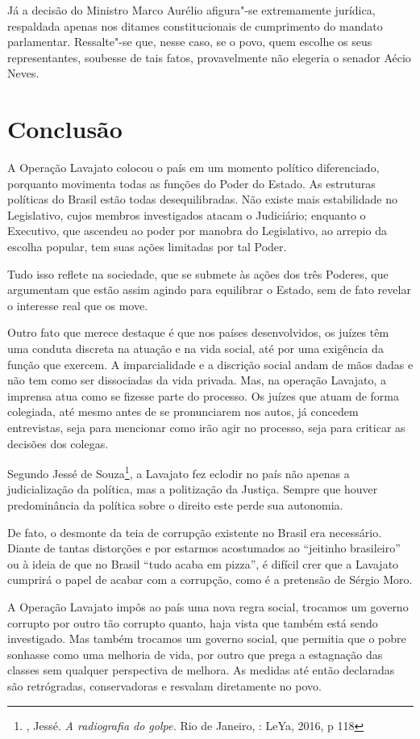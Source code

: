 Já a decisão do Ministro Marco Aurélio afigura"-se extremamente jurídica,
respaldada apenas nos ditames constitucionais de cumprimento do mandato
parlamentar. Ressalte"-se que, nesse caso, se o povo, quem escolhe os
seus representantes, soubesse de tais fatos, provavelmente não elegeria
o senador Aécio Neves.

\section{Conclusão}

A Operação Lavajato colocou o país em um momento político diferenciado,
porquanto movimenta todas as funções do Poder do Estado. As estruturas
políticas do Brasil estão todas desequilibradas. Não existe mais
estabilidade no Legislativo, cujos membros investigados atacam o
Judiciário; enquanto o Executivo, que ascendeu ao poder por manobra do
Legislativo, ao arrepio da escolha popular, tem suas ações limitadas por
tal Poder.

Tudo isso reflete na sociedade, que se submete às ações dos três
Poderes, que argumentam que estão assim agindo para equilibrar o Estado,
sem de fato revelar o interesse real que os move.

Outro fato que merece destaque é que nos países desenvolvidos, os juízes
têm uma conduta discreta na atuação e na vida social, até por uma
exigência da função que exercem. A imparcialidade e a discrição social
andam de mãos dadas e não tem como ser dissociadas da vida privada. Mas,
na operação Lavajato, a imprensa atua como se fizesse parte do processo.
Os juízes que atuam de forma colegiada, até mesmo antes de se
pronunciarem nos autos, já concedem entrevistas, seja para mencionar
como irão agir no processo, seja para criticar as decisões dos colegas.

Segundo Jessé de Souza\footnote{, Jessé. \emph{A radiografia do
  golpe.} Rio de Janeiro, : LeYa, 2016, p 118}, a Lavajato fez eclodir
no país não apenas a judicialização da política, mas a politização da
Justiça. Sempre que houver predominância da política sobre o direito
este perde sua autonomia.

De fato, o desmonte da teia de corrupção existente no Brasil era
necessário. Diante de tantas distorções e por estarmos acostumados ao
``jeitinho brasileiro'' ou à ideia de que no Brasil ``tudo acaba em
pizza'', é difícil crer que a Lavajato cumprirá o papel de acabar com a
corrupção, como é a pretensão de Sérgio Moro.

A Operação Lavajato impôs ao país uma nova regra social, trocamos um
governo corrupto por outro tão corrupto quanto, haja vista que também
está sendo investigado. Mas também trocamos um governo social, que
permitia que o pobre sonhasse como uma melhoria de vida, por outro que
prega a estagnação das classes sem qualquer perspectiva de melhora. As
medidas até então declaradas são retrógradas, conservadoras e resvalam
diretamente no povo.

